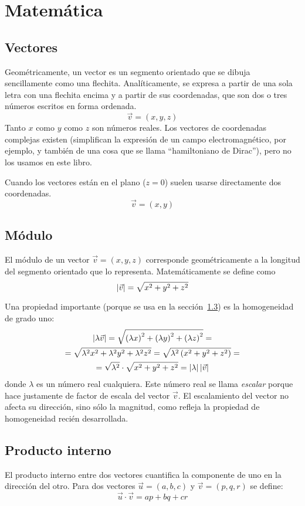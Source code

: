 \chapter{Matemática}


\section{Vectores}
Geométricamente, un vector es un segmento orientado que se dibuja sencillamente como una flechita.
Analíticamente, se expresa a partir de una sola letra con una flechita encima y a partir de sus coordenadas, que son dos o tres números escritos en forma ordenada.
\[ \vec{v} = (x, y, z) \]
Tanto $x$ como $y$ como $z$ son números reales.
Los vectores de coordenadas complejas existen (simplifican la expresión de un campo electromagnético, por ejemplo, y también de una cosa que se llama ``hamiltoniano de Dirac''), pero no los usamos en este libro.

Cuando los vectores están en el plano ($z = 0$) suelen usarse directamente dos coordenadas.
\[ \vec{v} = (x, y) \]


\section{Módulo}
El módulo de un vector $\Vec{v} = (x, y, z)$ corresponde geométricamente a la longitud del segmento orientado que lo representa.
Matemáticamente se define como
\[ {\left| {\vec{v}} \right|} = \sqrt{x^2 + y^2 + z^2} \]

Una propiedad importante (porque se usa en la sección~\ref{sec:innerProduct}) es la homogeneidad de grado uno:
\begin{multline*}
    {\left| {\lambda \vec{v}} \right|} = \sqrt{\left(\lambda x\right)^2 + \left(\lambda y\right)^2 + \left(\lambda z\right)^2} =
    \\
    = \sqrt{\lambda^2 x^2 + \lambda^2 y^2 + \lambda^2 z^2} = \sqrt{\lambda^2 \left( x^2 + y^2 + z^2 \right)} =
    \\
    = \sqrt{\lambda^2} \cdot \sqrt{x^2 + y^2 + z^2} = \left| \lambda \right| {\left| {\vec{v}} \right|}
\end{multline*}
donde $\lambda$ es un número real cualquiera.
Este número real se llama \emph{escalar} porque hace justamente de factor de escala del vector $\vec{v}$.
El escalamiento del vector no afecta su dirección, sino sólo la magnitud, como refleja la propiedad de homogeneidad recién desarrollada.


\section{Producto interno}
\label{sec:innerProduct}
El producto interno entre dos vectores cuantifica la componente de uno en la dirección del otro.
Para dos vectores $\vec{u}=(a,b,c)$ y $\vec{v}=(p,q,r)$ se define:
\[ \vec{u} \cdot \vec{v} = ap + bq + cr \]

